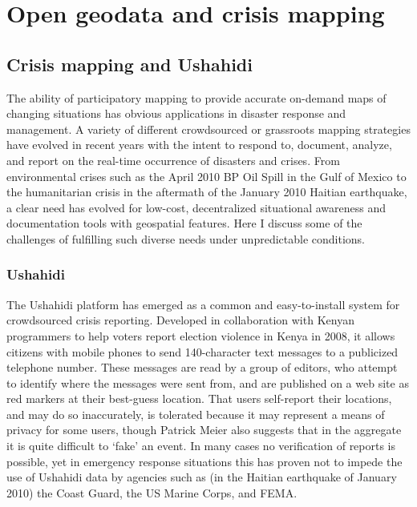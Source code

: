 \documentclass[11pt,oneside,notitlepage]{report}
\begin{document}
{{\section{Open geodata and crisis mapping}
\subsection{Crisis mapping and Ushahidi}

The ability of participatory mapping to provide accurate on-demand maps of changing situations has obvious applications in disaster response and management. A variety of different crowdsourced or grassroots mapping strategies have evolved in recent years with the intent to respond to, document, analyze, and report on the real-time occurrence of disasters and crises. From environmental crises such as the April 2010 BP Oil Spill in the Gulf of Mexico to the humanitarian crisis in the aftermath of the January 2010 Haitian earthquake, a clear need has evolved for low-cost, decentralized situational awareness and documentation tools with geospatial features. Here I discuss some of the challenges of fulfilling such diverse needs under unpredictable conditions.

\subsubsection{Ushahidi}

The Ushahidi platform has emerged as a common and easy-to-install system for crowdsourced crisis reporting. Developed in collaboration with Kenyan programmers to help voters report election violence in Kenya in 2008, it allows citizens with mobile phones to send 140-character text messages to a publicized telephone number. \cite{okolloh2009ushahidi} These messages are read by a group of editors, who attempt to identify where the messages were sent from, and are published on a web site as red markers at their best-guess location. That users self-report their locations, and may do so inaccurately, is tolerated because it may represent a means of privacy for some users, though Patrick Meier also suggests that in the aggregate it is quite difficult to `fake' an event. \cite{meier2010wag} In many cases no verification of reports is possible, yet in emergency response situations this has proven not to impede the use of Ushahidi data by agencies such as (in the Haitian earthquake of January 2010) the Coast Guard, the US Marine Corps, and FEMA. \cite{meier2010crowdsorcerors}\cite{meier2010ushahidi} 

}}
\end{document}

